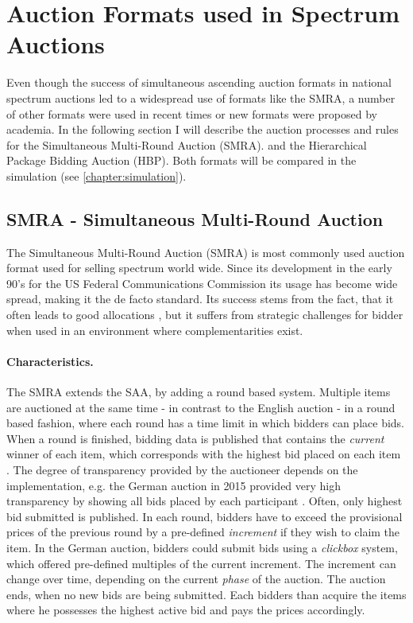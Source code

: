 \section{Auction Formats used in Spectrum Auctions}
Even though the success of simultaneous ascending auction formats in national spectrum auctions led to a widespread use of formats like the SMRA, %
a number of other formats were used in recent times or new formats were proposed by academia. In the following section I will describe the auction processes and rules for the Simultaneous Multi-Round Auction (SMRA). %
and the Hierarchical Package Bidding Auction (HBP). Both formats will be compared in the simulation (see \autoref{chapter:simulation}). %
 
\subsection{SMRA - Simultaneous Multi-Round Auction}\label{subsection:smra_theory}
The Simultaneous Multi-Round Auction (SMRA) is most commonly used auction format used for selling spectrum world wide. Since its development in the early 90's for the US Federal Communications Commission its usage has become wide spread, making it the de facto standard. Its success stems from the fact, that it often leads to good allocations \cite{BichlerLecture2016}, but it suffers from strategic challenges for bidder when used in an environment where complementarities exist.

\paragraph{Characteristics.}
The SMRA extends the SAA, by adding a round based system. Multiple items are auctioned at the same time - in contrast to the English auction - in a round based fashion, where each round has a time limit in which bidders can place bids.  When a round is finished, bidding data is published that contains the \textit{current} winner of each item, which corresponds with the highest bid placed on each item \cite{BichlerLecture2016}. The degree of transparency provided by the auctioneer depends on the implementation, e.g. the German auction in 2015 provided very high transparency by showing all bids placed by each participant \cite{Bundesnetzagentur2015}. Often, only highest bid submitted is published.
In each round, bidders have to exceed the provisional prices of the previous round by a pre-defined \textit{increment} if they wish to claim the item. In the German auction, bidders could submit bids using a \textit{clickbox} system, which offered pre-defined multiples of the current increment. The increment can change over time, depending on the current \textit{phase} of the auction. The auction ends, when no new bids are being submitted. Each bidders than acquire the items where he possesses the highest active bid and pays the prices accordingly. 

